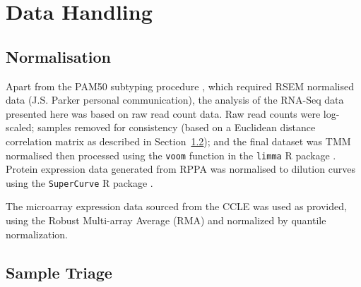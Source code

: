 \section{Data Handling}

\subsection{Normalisation}

Apart from the PAM50 subtyping procedure \citep{Parker2009}, which required RSEM normalised data (J.S. Parker personal communication), the analysis of the RNA-Seq data presented here was based on raw read count data. Raw read counts were log-scaled; samples removed for consistency (based on a Euclidean distance correlation matrix as described in Section~\ref{methods:sample_qc}); and the final dataset was TMM normalised \citep{Robinson2010} then processed using the \texttt{voom} function \citep{Law2014} in the \texttt{limma} R package \citep{limma}. Protein expression data generated from RPPA was normalised to dilution curves using the \texttt{SuperCurve} R package \citep{Neeley2009, Ju2015}.

The microarray expression data sourced from the \gls{CCLE} was used as provided, using the Robust Multi-array Average (RMA) and normalized by quantile normalization.

\FloatBarrier

\subsection{Sample Triage} \label{methods:sample_qc}

